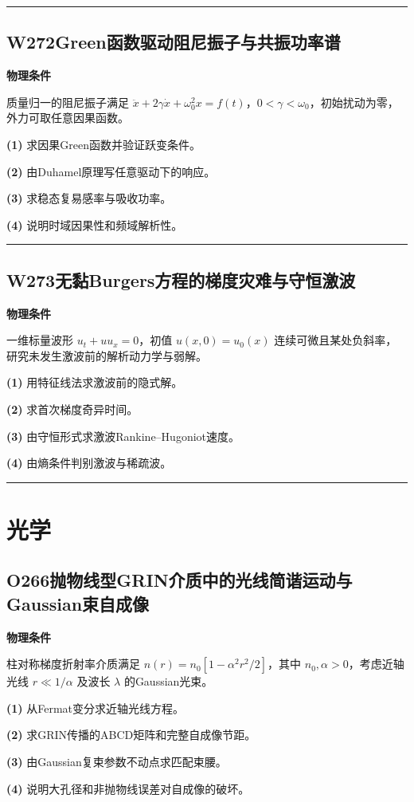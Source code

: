 \documentclass[UTF8,a4paper,11pt,oneside,openany]{ctexbook}
\begin{document}
\par\bigskip\hrule\bigskip
\section*{W272\quad Green函数驱动阻尼振子与共振功率谱}
\textbf{物理条件}\par 质量归一的阻尼振子满足 \(\ddot x+2\gamma\dot x+\omega_0^2x=f(t)\)，\(0<\gamma<\omega_0\)，初始扰动为零，外力可取任意因果函数。
\par\noindent\textbf{(1)} 求因果Green函数并验证跃变条件。
\par\noindent\textbf{(2)} 由Duhamel原理写任意驱动下的响应。
\par\noindent\textbf{(3)} 求稳态复易感率与吸收功率。
\par\noindent\textbf{(4)} 说明时域因果性和频域解析性。

\par\bigskip\hrule\bigskip
\section*{W273\quad 无黏Burgers方程的梯度灾难与守恒激波}
\textbf{物理条件}\par 一维标量波形 \(u_t+uu_x=0\)，初值 \(u(x,0)=u_0(x)\) 连续可微且某处负斜率，研究未发生激波前的解析动力学与弱解。
\par\noindent\textbf{(1)} 用特征线法求激波前的隐式解。
\par\noindent\textbf{(2)} 求首次梯度奇异时间。
\par\noindent\textbf{(3)} 由守恒形式求激波Rankine–Hugoniot速度。
\par\noindent\textbf{(4)} 由熵条件判别激波与稀疏波。

\par\bigskip\hrule\bigskip
\chapter{光学}
\section*{O266\quad 抛物线型GRIN介质中的光线简谐运动与Gaussian束自成像}
\textbf{物理条件}\par 柱对称梯度折射率介质满足 \(n(r)=n_0[1-\alpha^2r^2/2]\)，其中 \(n_0,\alpha>0\)，考虑近轴光线 \(r\ll1/\alpha\) 及波长 \(\lambda\) 的Gaussian光束。
\par\noindent\textbf{(1)} 从Fermat变分求近轴光线方程。
\par\noindent\textbf{(2)} 求GRIN传播的ABCD矩阵和完整自成像节距。
\par\noindent\textbf{(3)} 由Gaussian复束参数不动点求匹配束腰。
\par\noindent\textbf{(4)} 说明大孔径和非抛物线误差对自成像的破坏。
\end{document}
